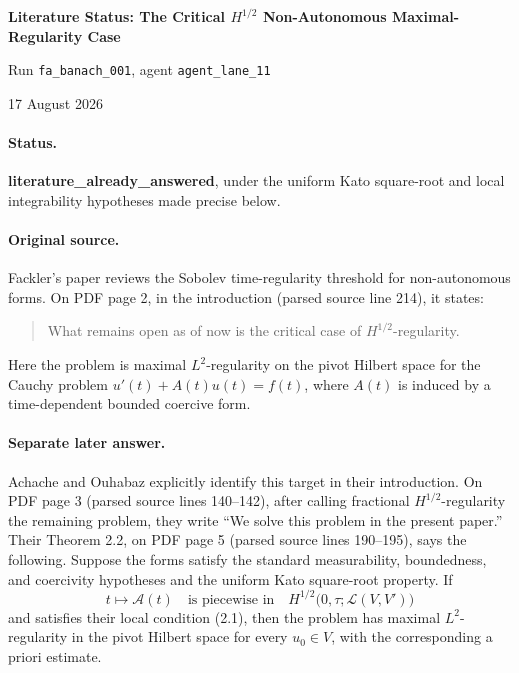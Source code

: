 \documentclass[10pt]{article}
\begin{document}
\begin{center}
{\Large\bfseries Literature Status: The Critical $H^{1/2}$
Non-Autonomous Maximal-Regularity Case\par}
\vspace{0.35em}
{Run \texttt{fa\_banach\_001}, agent \texttt{agent\_lane\_11}\par}
{\small 17 August 2026}
\end{center}
\vspace{0.4em}

\paragraph{Status.}
\textbf{literature\_already\_answered}, under the uniform Kato square-root
and local integrability hypotheses made precise below.

\paragraph{Original source.}
Fackler's paper \cite{F} reviews the Sobolev time-regularity threshold for
non-autonomous forms.  On PDF page 2, in the introduction (parsed source line
214), it states:
\begin{quote}
What remains open as of now is the critical case of
\(H^{1/2}\)-regularity.
\end{quote}
Here the problem is maximal $L^2$-regularity on the pivot Hilbert space for
the Cauchy problem $u'(t)+A(t)u(t)=f(t)$, where $A(t)$ is induced by a
time-dependent bounded coercive form.

\paragraph{Separate later answer.}
Achache and Ouhabaz \cite{AO} explicitly identify this target in their
introduction.  On PDF page 3 (parsed source lines 140--142), after calling
fractional $H^{1/2}$-regularity the remaining problem, they write ``We solve
this problem in the present paper.''  Their Theorem 2.2, on PDF page 5
(parsed source lines 190--195), says the following.  Suppose the forms satisfy
the standard measurability, boundedness, and coercivity hypotheses and the
uniform Kato square-root property.  If
\[
 t\longmapsto\mathcal A(t)
 \quad\text{is piecewise in}\quad
 H^{1/2}\bigl(0,\tau;\mathcal L(V,V')\bigr)
\]
and satisfies their local condition (2.1), then the problem has maximal
$L^2$-regularity in the pivot Hilbert space for every $u_0\in V$, with the
corresponding a priori estimate.
\end{document}
